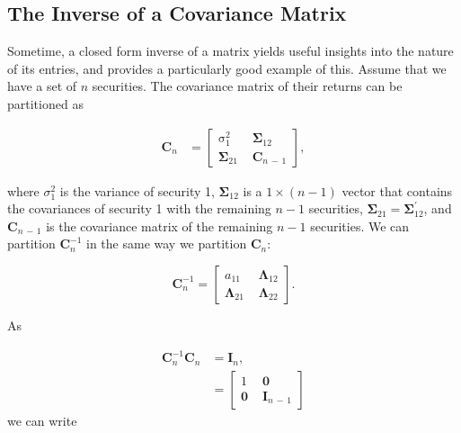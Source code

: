 \documentclass[graybox,envcountchap,sectrefs]{svmono}\usepackage[]{graphicx}\usepackage[]{xcolor}
\begin{document}
\begin{appendices}
\subsection{The Inverse of a Covariance Matrix}

Sometime, a closed form inverse of a matrix yields useful insights
into the nature of its entries, and \citet{Stevens1998} provides
a particularly good example of this. Assume that we have a set of
$n$ securities. The covariance matrix of their returns can be partitioned
as

\begin{align}
\mathrm{\mathbf{C}}_{n} & =\left[\begin{array}{c|c}
\mathrm{\sigma}_{1}^{2}\, & \,\mathbf{\Sigma}_{12}\\
\hline \mathbf{\Sigma}_{21}\, & \,\mathrm{\mathbf{C}}_{n\,-\,1}
\end{array}\right],\label{eq:GuyStevensCovMat}
\end{align}

where $\sigma_{1}^{2}$ is the variance of security 1, $\mathbf{\Sigma}_{12}$
is a $1\times(n-1)$ vector that contains the covariances of security
1 with the remaining $n-1$ securities, $\mathbf{\Sigma}_{21}=\mathbf{\Sigma}_{12}^{\prime}$,
and $\mathrm{\mathbf{C}}_{n\,-\,1}$ is the covariance matrix of the
remaining $n-1$ securities. We can partition $\mathrm{\mathbf{C}}_{n}^{-1}$
in the same way we partition $\mathrm{\mathbf{C}}_{n}$:

\begin{equation}
\mathrm{\mathbf{C}}_{n}^{-1}=\left[\begin{array}{c|c}
a_{11}\, & \,\mathbf{\Lambda}{}_{12}\\
\hline \mathrm{\mathbf{\Lambda}}_{21}\, & \,\mathrm{\mathbf{\Lambda}}_{22}
\end{array}\right].\label{eq:GuyStevensInverse1}
\end{equation}

As 

\begin{align}
\mathrm{\mathbf{C}}_{n}^{-1}\mathrm{\mathbf{C}}_{n} & =\mathrm{\mathbf{I}}_{n},\nonumber \\
 & =\left[\begin{array}{c|c}
1\, & \,\mathbf{0}\\
\hline \mathbf{0}\, & \,\mathrm{\mathbf{I}}_{n\,-\,1}
\end{array}\right]\label{eq:GuyStevensInverse2}
\end{align}
we can write


\end{appendices}
\end{document}
